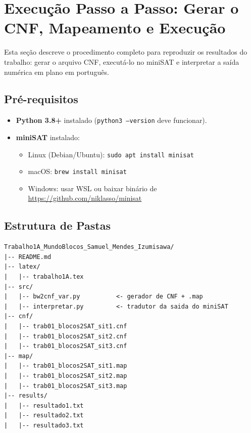 \documentclass[12pt,a4paper]{article}
\begin{document}
\section{Execução Passo a Passo: Gerar o CNF, Mapeamento e Execução}
\label{sec:execucao}

Esta seção descreve o procedimento completo para reproduzir os resultados do trabalho: gerar o arquivo CNF, executá-lo no miniSAT e interpretar a saída numérica em plano em português.

\subsection{Pré-requisitos}

\begin{itemize}[leftmargin=1.2cm]
    \item \textbf{Python 3.8+} instalado (\texttt{python3 --version} deve funcionar).
    \item \textbf{miniSAT} instalado:
    \begin{itemize}
        \item Linux (Debian/Ubuntu): \texttt{sudo apt install minisat}
        \item macOS: \texttt{brew install minisat}
        \item Windows: usar WSL ou baixar binário de \url{https://github.com/niklasso/minisat}
    \end{itemize}
\end{itemize}

\subsection{Estrutura de Pastas}

\begin{lstlisting}
Trabalho1A_MundoBlocos_Samuel_Mendes_Izumisawa/
|-- README.md
|-- latex/
|   |-- trabalho1A.tex
|-- src/
|   |-- bw2cnf_var.py          <- gerador de CNF + .map
|   |-- interpretar.py         <- tradutor da saida do miniSAT
|-- cnf/
|   |-- trab01_blocos2SAT_sit1.cnf
|   |-- trab01_blocos2SAT_sit2.cnf
|   |-- trab01_blocos2SAT_sit3.cnf
|-- map/
|   |-- trab01_blocos2SAT_sit1.map
|   |-- trab01_blocos2SAT_sit2.map
|   |-- trab01_blocos2SAT_sit3.map
|-- results/
|   |-- resultado1.txt
|   |-- resultado2.txt
|   |-- resultado3.txt
\end{lstlisting}
\end{document}
